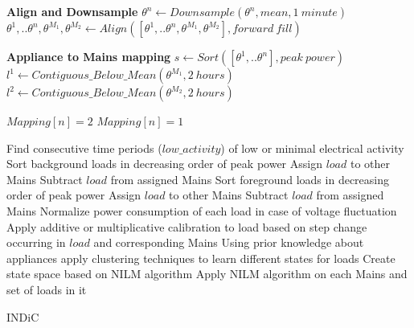 \documentclass[conference]{IEEEtran}
\begin{document}
\begin{algorithm}
\DontPrintSemicolon %
\textbf{Align and Downsample}\;
	{
	$\theta^n \gets Downsample(\theta^n,mean,1\: minute)$\;
	}
$\theta^1,..\theta^n,\theta^{M_1},\theta^{M_2} \gets Align([\theta^1,..\theta^n,\theta^{M_1},\theta^{M_2}],forward\: fill)$\;

\textbf{Appliance to Mains mapping}\;
$s \gets Sort([\theta^1,..\theta^n],peak\: power)$\;
$l^1 \gets Contiguous\_Below\_Mean (\theta^{M_1}, 2\: hours)$\;
$l^2 \gets Contiguous\_Below\_Mean (\theta^{M_2}, 2\: hours)$\;
	{
		{ $Mapping[n]=2$\;		
		}  
		{ $Mapping[n]=1$\;
		}
	
	}
Find consecutive time periods ($low\_activity$) of low or minimal electrical activity\;
Sort background loads in decreasing order of peak power \;
	{
	 {
	Assign $load$ to other Mains\;	
	}
	Subtract $load$ from assigned Mains
	}
Sort foreground loads in decreasing order of peak power\;
	{
	 {
	Assign $load$ to other Mains\;	
	}
	Subtract $load$ from assigned Mains
	}
{
Normalize power consumption of each load in case of voltage fluctuation\;
Apply additive or multiplicative calibration to load based on step change occurring in $load$ and corresponding Mains\;
Using prior knowledge about appliances apply clustering techniques to learn different states for loads\;
}
Create state space based on NILM algorithm\;
Apply NILM algorithm on each Mains and set of loads in it

\;
\caption{INDiC}
\label{algo:main}
\end{algorithm}
\end{document}
